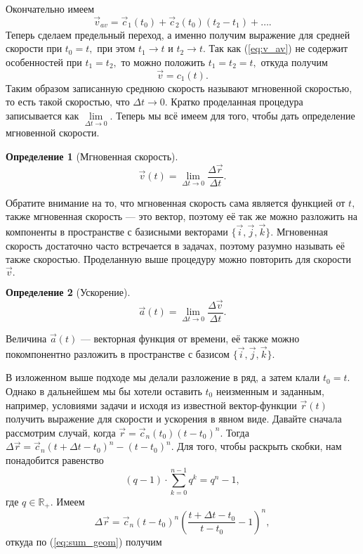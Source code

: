 \documentclass[a5paper,11pt]{article}
\newtheorem{definition}{Определение}
\begin{document}
Окончательно имеем
\begin{equation}
\vec{v}_{av} = \vec{c}_1(t_0) + \vec{c}_2(t_0)(t_2-t_1) +  \ldots.
\label{eq:v_av}
\end{equation}
Теперь сделаем предельный переход, а именно получим выражение для средней
скорости при $t_0 = t,$ при этом $t_1 \to t$ и $t_2 \to t.$ Так как
(\ref{eq:v_av}) не содержит особенностей при $t_1 = t_2,$ то можно
положить $t_1 = t_2 = t,$ откуда получим
$$\vec{v} = c_1 (t).$$
Таким образом записанную среднюю скорость называют мгновенной скоростью, то есть
такой скоростью, что $\Delta t \to 0.$ 
Кратко проделанная процедура записывается
как $\lim\limits_{\Delta t \to 0}.$ 
Теперь мы всё имеем для того, чтобы дать определение
мгновенной скорости.
\begin{definition}[Мгновенная скорость]
$$\vec{v}(t) = \lim\limits_{\Delta t \to 0} \frac {\Delta \vec{r}}{\Delta t}.$$
\end{definition}
Обратите внимание на то, что мгновенная скорость
сама является функцией от $t,$ также мгновенная скорость --- это вектор, поэтому
её так же можно разложить на компоненты в пространстве с базисными векторами $\{\vec{i},\vec{j},\vec{k}\}.$
Мгновенная скорость достаточно часто встречается в задачах, поэтому разумно
называть её также скоростью.
Проделанную выше процедуру можно повторить для скорости $\vec{v}.$
\begin{definition}[Ускорение]
$$\vec{a}(t) = \lim\limits_{\Delta t \to 0} \frac {\Delta \vec{v}}{\Delta t}.$$
\end{definition}
Величина $\vec{a}(t)$ --- векторная функция от времени, её также можно покомпонентно разложить
в пространстве с базисом $\{\vec{i}, \vec{j}, \vec{k}\}.$
\par
В изложенном выше подходе мы делали разложение в ряд, а затем клали  $t_0 = t.$ Однако в дальнейшем
мы бы хотели оставить $t_0$ неизменным и заданным, например, условиями задачи и исходя
из известной вектор-функции $\vec{r}(t)$ получить выражение для скорости и ускорения в явном
виде. Давайте сначала рассмотрим случай, когда $\vec{r} = \vec{c}_n (t_0) (t-t_0)^n.$
Тогда $\Delta \vec{r} = \vec{c}_n (t+\Delta t -t_0)^n-(t-t_0)^n.$ Для того, чтобы
раскрыть скобки, нам понадобится равенство 
\begin{equation}
(q-1)\cdot \sum\limits_{k=0}^{n-1}q^k = q^n-1,
\label{eq:sum_geom}
\end{equation}
где $q \in \mathbb{R}_+.$ Имеем
$$\Delta \vec{r} = \vec{c}_n (t-t_0)^n\left(\frac{t+\Delta t-t_0}{t-t_0} - 1\right)^n,$$
откуда по (\ref{eq:sum_geom}) получим
\end{document}
